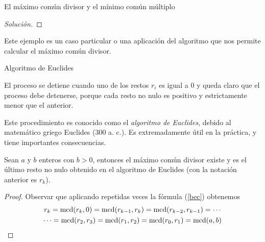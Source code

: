 \begin{section}{El máximo común divisor y el mínimo común múltiplo}
\begin{proof}[Solución]
\end{proof}

Este ejemplo es un caso particular o una aplicación del algoritmo que nos permite calcular el máximo común divisor.





\begin{table}[htbp]
\centering
{}
\caption{Algoritmo de Euclides}
\label{tabla-AE}
\end{table}

El proceso se detiene cuando uno de los restos $r_i$  es igual a $0$ y queda claro que el proceso debe detenerse, porque cada resto no nulo es positivo y estrictamente menor que el anterior.

Este procedimiento es conocido como el \textit{algoritmo de Euclides}, debido al matemático griego Euclides ($300$ a. c.). Es extremadamente útil en la práctica, y tiene importantes consecuencias.


\begin{teorema} Sean  $a$ y $b$ enteros con $b >0$, entonces el máximo común divisor existe y es el último resto no nulo obtenido en el algoritmo de Euclides (con la notación anterior es $r_k$). 
\end{teorema}
\begin{proof}
Observar que aplicando repetidas veces la fórmula (\ref{bec}) obtenemos 
\begin{multline*}
r_k = \operatorname{mcd}(r_{k},0) = \operatorname{mcd}(r_{k-1},r_k) =\operatorname{mcd}(r_{k-2},r_{k-1}) = \cdots\\\cdots 
=  \operatorname{mcd}(r_2,r_3) =  \operatorname{mcd}(r_1,r_2)  =  \operatorname{mcd}(r_0,r_1) = \operatorname{mcd}(a,b)  
\end{multline*}
\end{proof}



\end{section}
